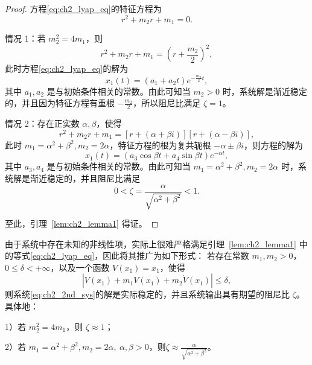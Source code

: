 \begin{proof}
方程\eqref{eq:ch2_lyap_eq}的特征方程为
\begin{equation}\label{eq:ch2_char}
r^2+m_2r+m_1=0.
\end{equation}

情况 1：若 $m_2^2=4m_1$，则
\begin{equation}\label{eq:ch2_case1}
r^2+m_2r+m_1=\left(r+\frac{m_2}{2}\right)^2,
\end{equation}
此时方程\eqref{eq:ch2_lyap_eq}的解为
\begin{equation}\label{eq:ch2_case1_sol}
x_1(t)=\left(a_1+a_2t\right)e^{-\frac{m_2}{2}t},
\end{equation}
其中 $a_1,a_2$ 是与初始条件相关的常数。由此可知当 $m_2>0$ 时，系统解是渐近稳定的，并且因为特征方程有重根 $-\frac{m_2}{2}$，所以阻尼比满足 $\zeta=1$。

情况 2：存在正实数 $\alpha,\beta$，使得
\begin{equation}\label{eq:ch2_case2}
r^2+m_2r+m_1=\left[r+(\alpha+\beta i)\right]\left[r+(\alpha-\beta i)\right],
\end{equation}
此时 $m_1=\alpha^2+\beta^2,m_2=2\alpha$，特征方程的根为复共轭根 $-\alpha\pm\beta i$，则方程的解为
\begin{equation}\label{eq:ch2_case2_sol}
x_1(t)=\left(a_3\cos\beta t+a_4\sin\beta t\right)e^{-\alpha t},
\end{equation}
其中 $a_3,a_4$ 是与初始条件相关的常数。由此可知当 $m_1=\alpha^2+\beta^2,m_2=2\alpha$ 时，系统解是渐近稳定的，并且阻尼比满足
\begin{equation}
0<\zeta=\frac{\alpha}{\sqrt{\alpha^2+\beta^2}}<1.
\end{equation}

至此，引理~\ref{lem:ch2_lemma1} 得证。
\end{proof}

\begin{lemma}\label{lem:ch2_lemma2}
由于系统中存在未知的非线性项，实际上很难严格满足引理~\ref{lem:ch2_lemma1} 中的等式\eqref{eq:ch2_lyap_eq}，因此将其推广为如下形式：
若存在常数 $m_1,m_2>0$，$0\le\delta<+\infty$，以及一个函数 $V(x_1)=x_1$，使得
\begin{equation}\label{eq:ch2_lyap_ineq}
\left|\ddot{V}(x_1)+m_1V(x_1)+m_2\dot{V}(x_1)\right|\le\delta,
\end{equation}
则系统\eqref{eq:ch2_2nd_sys}的解是实际稳定的，并且系统输出具有期望的阻尼比 $\zeta$。具体地：

1）若 $m_2^2=4m_1$，则 $\zeta\approx1$；

2）若 $m_1=\alpha^2+\beta^2,m_2=2\alpha,\ \alpha,\beta>0$，则$\zeta\approx\frac{\alpha}{\sqrt{\alpha^2+\beta^2}}$。

\end{lemma}

